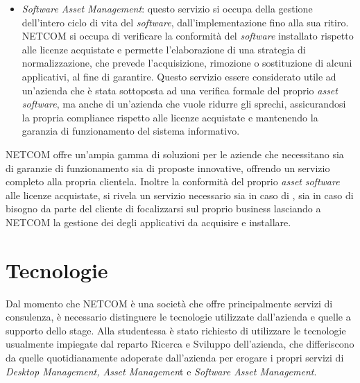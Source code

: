 \begin{itemize}
    \item \emph{Software Asset Management}: questo servizio si occupa della gestione dell’intero ciclo di vita del \emph{software}, dall’implementazione fino alla sua ritiro.
    NETCOM si occupa di verificare la conformità del \emph{software} installato rispetto alle licenze acquistate e permette l’elaborazione di una strategia di normalizzazione, che prevede l’acquisizione, rimozione o sostituzione di alcuni applicativi, al fine di garantire.
    Questo servizio essere considerato utile ad un’azienda che è stata sottoposta ad una verifica formale del proprio \emph{asset software}, ma anche di un’azienda che vuole ridurre gli sprechi, assicurandosi la propria compliance rispetto alle licenze acquistate e mantenendo la garanzia di funzionamento del sistema informativo.
\end{itemize}
NETCOM offre un’ampia gamma di soluzioni per le aziende che necessitano sia di garanzie di funzionamento sia di proposte innovative, offrendo un servizio completo alla propria clientela.
Inoltre la conformità del proprio \emph{asset} \emph{software} alle licenze acquistate, si rivela un servizio necessario sia in caso di , sia in caso di bisogno da parte del cliente di focalizzarsi sul proprio business lasciando a NETCOM la gestione dei degli applicativi da acquisire e installare. \cite{netcom-info}

\section{Tecnologie} 
Dal momento che NETCOM è una società che offre principalmente servizi di consulenza, è necessario distinguere le tecnologie utilizzate dall'azienda e quelle a supporto dello stage.
Alla studentessa è stato richiesto di utilizzare le tecnologie usualmente impiegate dal reparto Ricerca e Sviluppo dell'azienda, che differiscono da quelle quotidianamente adoperate dall’azienda per erogare i propri servizi di \emph{Desktop Management, Asset Managemen}t e \emph{Software Asset Management}.
